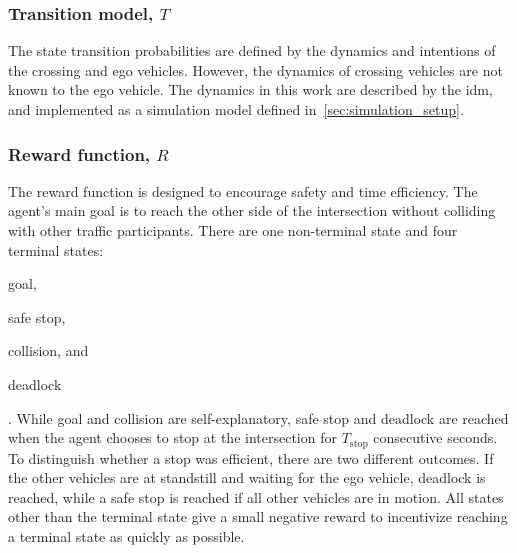 \subsubsection{Transition model, $T$}
\label{sec:transition_model}
The state transition probabilities are defined by the dynamics and intentions of the crossing and ego vehicles. However, the dynamics of crossing vehicles are not known to the ego vehicle. The dynamics in this work are described by the \gls{idm}, and implemented as a simulation model defined in~\ref{sec:simulation_setup}. 

\subsubsection{Reward function, $R$}
\label{sec:reward}
The reward function is designed to encourage safety and time efficiency. The agent's main goal is to reach the other side of the intersection without colliding with other traffic participants. There are one non-terminal state and four terminal states: 
\begin{enumerate*}[label=(\roman*)] 
\item goal, 
\item safe stop, 
\item collision, and 
\item deadlock 
\end{enumerate*}. 
While goal and collision are self-explanatory, safe stop and deadlock are reached when the agent chooses to stop at the intersection for $T_\mathrm{stop}$ consecutive seconds. To distinguish whether a stop was efficient, there are two different outcomes. If the other vehicles are at standstill and waiting for the ego vehicle, deadlock is reached, while a safe stop is reached if all other vehicles are in motion. All states other than the terminal state give a small negative reward to incentivize reaching a terminal state as quickly as possible. 


